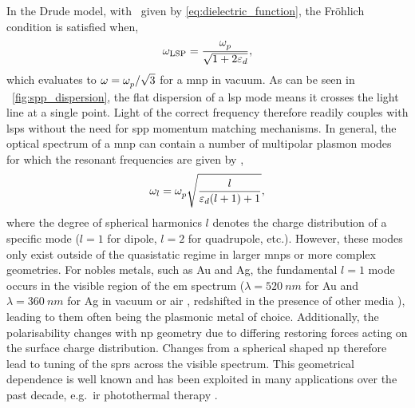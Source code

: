 \documentclass{article}
\begin{document}
In the Drude model, with \dielectric\ given by \eqref{eq:dielectric_function}, the Fr\"{o}hlich condition is satisfied when,
\begin{equation}
	\omega_{\mathrm{LSP}} = \frac{\omega_{p}^{}}{\sqrt{1+2\varepsilon_d}},
\end{equation}
which evaluates to $\omega = \omega_{p}^{}/\sqrt{3}$ for a \gls{mnp} in vacuum. As can be seen in \figurename~\ref{fig:spp_dispersion}, the flat dispersion of a \gls{lsp} mode means it crosses the light line at a single point. Light of the correct frequency therefore readily couples with \glspl{lsp} without the need for \gls{spp} momentum matching mechanisms.
In general, the optical spectrum of a \gls{mnp} can contain a number of multipolar plasmon modes for which the resonant frequencies are given by \cite{prodan2004},
\begin{equation}
	\omega_l = \omega_{p}^{}\sqrt{\frac{l}{\varepsilon_d(l+1)+1}},
\end{equation}
where the degree of spherical harmonics $l$ denotes the charge distribution of a specific mode ($l=1$ for dipole, $l=2$ for quadrupole, etc.). However, these modes only exist outside of the quasistatic regime in larger \glspl{mnp} or more complex geometries.
For nobles metals, such as Au and Ag, the fundamental $l=1$ mode occurs in the visible region of the \gls{em} spectrum ($\lambda=\SI{520}{nm}$ for Au and $\lambda=\SI{360}{nm}$ for Ag in vacuum or air \cite{maier2007plasmonics}, redshifted in the presence of other media \cite{sonnichsen2000}), leading to them often being the plasmonic metal of choice.
Additionally, the polarisability changes with \gls{np} geometry due to differing restoring forces acting on the surface charge distribution. Changes from a spherical shaped \gls{np} therefore lead to tuning of the \glspl{spr} across the visible spectrum. This geometrical dependence is well known \cite{krenn2000, mock2002, kuwata2003} and has been exploited in many applications over the past decade, e.g.\ \gls{ir} photothermal therapy \cite{huang2006, huang2008, huang2010gold}.
\end{document}

